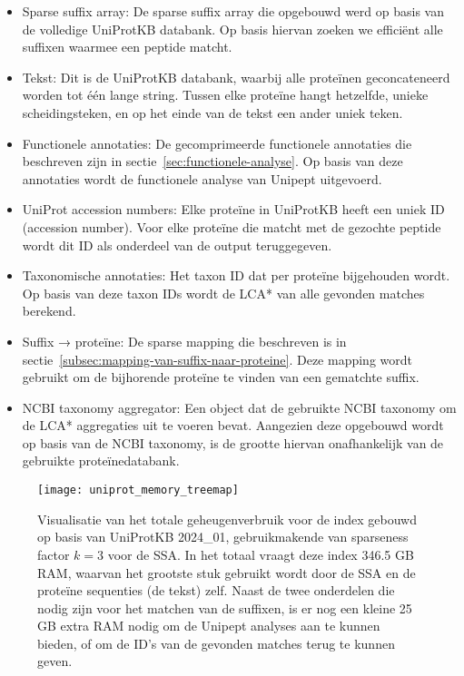 \begin{itemize}
    \item Sparse suffix array: De sparse suffix array die opgebouwd werd op basis van de volledige UniProtKB databank.
    Op basis hiervan zoeken we efficiënt alle suffixen waarmee een peptide matcht.
    \item Tekst: Dit is de UniProtKB databank, waarbij alle proteïnen geconcateneerd worden tot één lange string.
    Tussen elke proteïne hangt hetzelfde, unieke scheidingsteken, en op het einde van de tekst een ander uniek teken.
    \item Functionele annotaties: De gecomprimeerde functionele annotaties die beschreven zijn in sectie~\ref{sec:functionele-analyse}.
    Op basis van deze annotaties wordt de functionele analyse van Unipept uitgevoerd.
    \item UniProt accession numbers: Elke proteïne in UniProtKB heeft een uniek ID (accession number).
    Voor elke proteïne die matcht met de gezochte peptide wordt dit ID als onderdeel van de output teruggegeven.
    \item Taxonomische annotaties: Het taxon ID dat per proteïne bijgehouden wordt.
    Op basis van deze taxon IDs wordt de LCA* van alle gevonden matches berekend.
    \item Suffix → proteïne: De sparse mapping die beschreven is in sectie~\ref{subsec:mapping-van-suffix-naar-proteine}.
    Deze mapping wordt gebruikt om de bijhorende proteïne te vinden van een gematchte suffix.
    \item NCBI taxonomy aggregator: Een object dat de gebruikte NCBI taxonomy om de LCA* aggregaties uit te voeren bevat.
    Aangezien deze opgebouwd wordt op basis van de NCBI taxonomy, is de grootte hiervan onafhankelijk van de gebruikte proteïnedatabank.
\end{itemize}

\begin{figure}[h]
    \centering
    \texttt{[image: uniprot\_memory\_treemap]}
    \caption{Visualisatie van het totale geheugenverbruik voor de index gebouwd op basis van UniProtKB 2024\_01, gebruikmakende van sparseness factor $k = 3$ voor de SSA.
    In het totaal vraagt deze index 346.5 GB RAM, waarvan het grootste stuk gebruikt wordt door de SSA en de proteïne sequenties (de tekst) zelf.
    Naast de twee onderdelen die nodig zijn voor het matchen van de suffixen, is er nog een kleine 25 GB extra RAM nodig om de Unipept analyses aan te kunnen bieden, of om de ID's van de gevonden matches terug te kunnen geven.}
    \label{fig:uniprot_memory_treemap}
\end{figure}
\newpage
